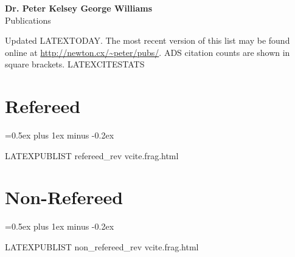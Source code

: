 \documentclass[letterpaper,11pt]{article}
\newenvironment{publist}{
  \begingroup
  \raggedright
  \parskip=0.5ex plus 1ex minus -0.2ex
}{
  \endgroup
}
\begin{document}
\pagestyle{fancy}
\lhead{} \chead{} \rhead{} \renewcommand{\headrule}{\relax}
\cfoot{\thepage/\pageref*{LastPage}}

\begin{center}
\textbf{\Large Dr. Peter Kelsey George Williams} \\
{\large Publications}
\end{center}

\noindent Updated
LATEXTODAY.
The most recent version of this list may be found online at
\url{http://newton.cx/~peter/pubs/}. ADS citation counts are shown in square
brackets.
LATEXCITESTATS

\section*{Refereed}

\begin{publist}
LATEXPUBLIST refereed_rev vcite.frag.html
\end{publist}

\section*{Non-Refereed}

\begin{publist}
LATEXPUBLIST non_refereed_rev vcite.frag.html
\end{publist}
\end{document}
